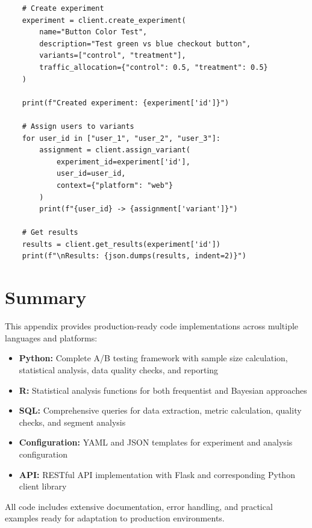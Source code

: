 \begin{lstlisting}
    # Create experiment
    experiment = client.create_experiment(
        name="Button Color Test",
        description="Test green vs blue checkout button",
        variants=["control", "treatment"],
        traffic_allocation={"control": 0.5, "treatment": 0.5}
    )

    print(f"Created experiment: {experiment['id']}")

    # Assign users to variants
    for user_id in ["user_1", "user_2", "user_3"]:
        assignment = client.assign_variant(
            experiment_id=experiment['id'],
            user_id=user_id,
            context={"platform": "web"}
        )
        print(f"{user_id} -> {assignment['variant']}")

    # Get results
    results = client.get_results(experiment['id'])
    print(f"\nResults: {json.dumps(results, indent=2)}")
\end{lstlisting}

\section{Summary}

This appendix provides production-ready code implementations across multiple languages and platforms:

\begin{itemize}
    \item \textbf{Python:} Complete A/B testing framework with sample size calculation, statistical analysis, data quality checks, and reporting
    \item \textbf{R:} Statistical analysis functions for both frequentist and Bayesian approaches
    \item \textbf{SQL:} Comprehensive queries for data extraction, metric calculation, quality checks, and segment analysis
    \item \textbf{Configuration:} YAML and JSON templates for experiment and analysis configuration
    \item \textbf{API:} RESTful API implementation with Flask and corresponding Python client library
\end{itemize}

All code includes extensive documentation, error handling, and practical examples ready for adaptation to production environments.
